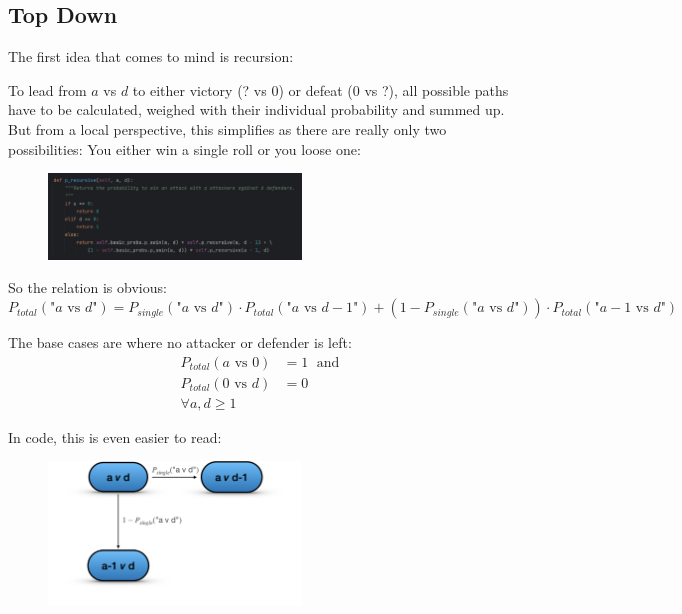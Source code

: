 \documentclass[11pt,a4paper]{article}
\begin{document}
    \subsection{Top Down}
    The first idea that comes to mind is recursion:

    To lead from $a$ vs $d$ to either victory (? vs 0) or defeat (0 vs ?), all possible paths have to be calculated, weighed with their individual probability and summed up.
    But from a local perspective, this simplifies as there are really only two possibilities: You either win a single roll or you loose one:

    \begin{figure}[H]
        \centering
        \includegraphics[width=0.6\textwidth]{../images/Recursive.png}
    \end{figure}

    So the relation is obvious:
    \[ P_{total}(\text{"$a$ vs $d$"}) = P_{single}(\text{"$a$ vs $d$"}) \cdot P_{total}(\text{"$a$ vs $d-1$"}) + (1 - P_{single}(\text{"$a$ vs $d$"})) \cdot P_{total}(\text{"$a-1$ vs $d$"}) \]

    The base cases are where no attacker or defender is left:
    \[ \begin{aligned}
           P_{total}(\text{$a$ vs 0}) &= 1 \; \text{ and}\\ P_{total}(\text{0 vs $d$}) &= 0 \\ \forall{a, d \geq 1}
    \end{aligned} \]

    In code, this is even easier to read:

    \begin{figure}[H]
        \centering
        \includegraphics[width=0.6\textwidth]{../images/Basic Recursion.png}
    \end{figure}
\end{document}
